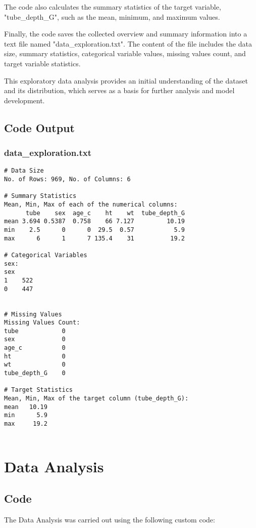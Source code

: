 \documentclass[11pt]{article}
\begin{document}
The code also calculates the summary statistics of the target variable, "tube\_depth\_G", such as the mean, minimum, and maximum values.

Finally, the code saves the collected overview and summary information into a text file named "data\_exploration.txt". The content of the file includes the data size, summary statistics, categorical variable values, missing values count, and target variable statistics.

This exploratory data analysis provides an initial understanding of the dataset and its distribution, which serves as a basis for further analysis and model development.

\subsection{Code Output}

\subsubsection*{data\_exploration.txt}

\begin{Verbatim}[tabsize=4]
# Data Size
No. of Rows: 969, No. of Columns: 6

# Summary Statistics
Mean, Min, Max of each of the numerical columns:
      tube    sex  age_c    ht    wt  tube_depth_G
mean 3.694 0.5387  0.758    66 7.127         10.19
min    2.5      0      0  29.5  0.57           5.9
max      6      1      7 135.4    31          19.2

# Categorical Variables
sex:
sex
1    522
0    447


# Missing Values
Missing Values Count:
tube            0
sex             0
age_c           0
ht              0
wt              0
tube_depth_G    0

# Target Statistics
Mean, Min, Max of the target column (tube_depth_G):
mean   10.19
min      5.9
max     19.2


\end{Verbatim}

\section{Data Analysis}
\subsection{{Code}}
The Data Analysis was carried out using the following custom code:
\end{document}
